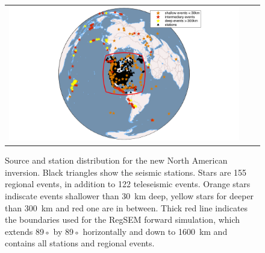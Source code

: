 \documentclass[12pt]{article}
\begin{document}
	\begin{figure}
		\centering
		\begin{tabular}{ccc}
			\includegraphics[width=1\textwidth]{figures/map_events_stn_global.png}
		\end{tabular}

		\caption{\baselineskip 18pt 
		Source and station distribution for the new North American inversion. Black triangles show the seismic stations. Stars are 155 regional events, in addition to 122 teleseismic events. Orange stars indiscate events shallower than 30~km deep, yellow stars for deeper than 300~km and red one are in between. Thick red line indicates the boundaries used for the RegSEM forward simulation, which extends 89◦ by 89◦ horizontally and down to 1600~km and contains all stations and regional events.}

		\label{map_evt_stn}
	\end{figure}
\end{document}
